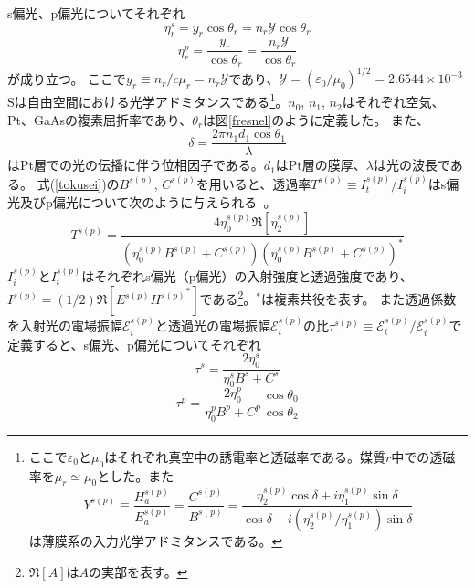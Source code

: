s偏光、p偏光についてそれぞれ
\begin{equation}
\eta_r^s=y_r\cos\theta_r=n_r\mathscr{Y}\cos\theta_r \label{ads}
\end{equation}
\begin{equation}
\eta_r^p=\frac{y_r}{\cos\theta_r}=\frac{n_r\mathscr{Y}}{\cos\theta_r}\label{adp}
\end{equation}
が成り立つ。
ここで$y_r\equiv n_r/c\mu_r=n_r\mathscr{Y}$であり、$\mathscr{Y}=(\varepsilon _0/\mu_0)^{1/2}=2.6544\times 10^{-3}$ Sは自由空間における光学アドミタンスである\footnote{ここで$\varepsilon _0$と$\mu_0$はそれぞれ真空中の誘電率と透磁率である。媒質$r$中での透磁率を$\mu_r\simeq \mu_0$とした。また
\begin{equation}
Y^{s(p)} \equiv  \frac{{{H_a^{s(p)}}}}{{{E_a^{s(p)}}}} = \frac{C^{s(p)}}{B^{s(p)}} = \frac{{{\eta _2^{s(p)}}\cos \delta  + i{\eta _1^{s(p)}}\sin \delta }}{{\cos \delta  + i({\eta _2^{s(p)}}/{\eta _1^{s(p)}})\sin \delta }}
\end{equation}
は薄膜系の入力光学アドミタンスである。}。$n_0$, $n_1$, $n_2$はそれぞれ空気、Pt、GaAsの複素屈折率であり、$\theta_r$は図\ref{fresnel}のように定義した。
また、
\begin{equation}
\delta=\frac{2\pi n_1 d_1 \cos\theta_1}{\lambda}
\end{equation}
はPt層での光の伝播に伴う位相因子である。$d_1$はPt層の膜厚、$\lambda$は光の波長である。
式(\ref{tokusei})の$B^{s(p)}$, $C^{s(p)}$を用いると、透過率$T^{s(p)}\equiv I_t^{s(p)}/I_i^{s(p)}$はs偏光及びp偏光について次のように与えられる~\cite{Macleod}。
\begin{equation}
T^{s(p)} = \frac{{4{\eta^{s(p)} _0}\Re [{\eta^{s(p)} _2}]}}{{({\eta^{s(p)} _0}B ^{s(p)}+ C^{s(p)}){{({\eta^{s(p)} _0}B^{s(p)} + C^{s(p)})}^*}}}\label{toukaritu}
\end{equation}
$I_i^{s(p)}$と$I_t^{s(p)}$はそれぞれs偏光（p偏光）の入射強度と透過強度であり、$I^{s(p)}=(1/2)\Re[E^{s(p)}{H^{s(p)}}^*]$である\footnote{$\Re[A]$は$A$の実部を表す。}。$^*$は複素共役を表す。
また透過係数を入射光の電場振幅$\mathscr{E}_i^{s(p)}$と透過光の電場振幅$\mathscr{E}_t^{s(p)}$の比$\tau^{s(p)}\equiv \mathscr{E}_t^{s(p)}/\mathscr{E}_i^{s(p)}$で定義すると、s偏光、p偏光についてそれぞれ
\begin{equation}
\tau ^s = \frac{{2{\eta^{s} _0}}}{{{\eta^{s} _0}B^s + C^s}}\label{toukakeisuus}
\end{equation}
\begin{equation}
\tau ^p = \frac{{2{\eta^{p} _0}}}{{{\eta^{p} _0}B^p + C^p}}\frac{\cos\theta_0}{\cos\theta_2}\label{toukakeisuup}
\end{equation}
